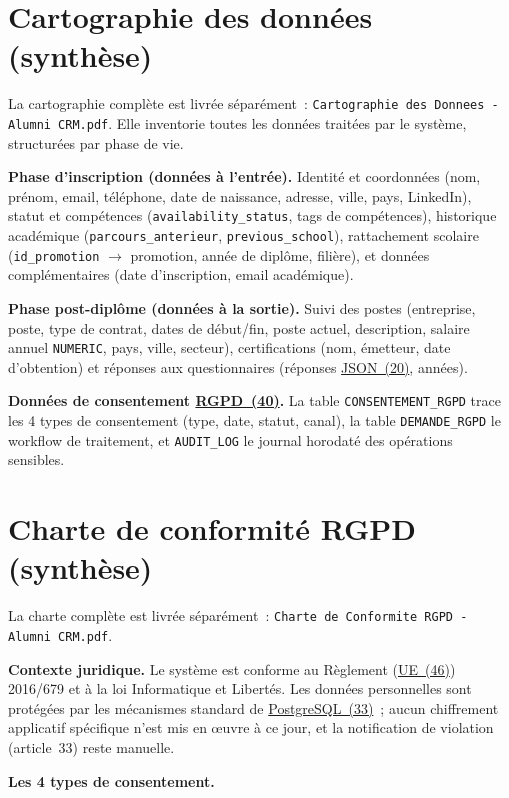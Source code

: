 \documentclass[12pt,a4paper]{report}
\begin{document}
\chapter{Cartographie des données (synthèse)}

\label{app:cartographie}
La cartographie complète est livrée séparément~: \texttt{Cartographie des Donnees - Alumni CRM.pdf}. Elle inventorie toutes les données traitées par le système, structurées par phase de vie.

\textbf{Phase d'inscription (données à l'entrée).} Identité et coordonnées (nom, prénom, email, téléphone, date de naissance, adresse, ville, pays, LinkedIn), statut et compétences (\texttt{availability\_status}, tags de compétences), historique académique (\texttt{parcours\_anterieur}, \texttt{previous\_school}), rattachement scolaire (\texttt{id\_promotion} $\rightarrow$ promotion, année de diplôme, filière), et données complémentaires (date d'inscription, email académique).

\textbf{Phase post-diplôme (données à la sortie).} Suivi des postes (entreprise, poste, type de contrat, dates de début/fin, poste actuel, description, salaire annuel \texttt{NUMERIC}, pays, ville, secteur), certifications (nom, émetteur, date d'obtention) et réponses aux questionnaires (réponses \hyperlink{abbr-JSON}{JSON~(20)}, années).

\textbf{Données de consentement \hyperlink{abbr-RGPD}{RGPD~(40)}.} La table \texttt{CONSENTEMENT\_RGPD} trace les 4 types de consentement (type, date, statut, canal), la table \texttt{DEMANDE\_RGPD} le workflow de traitement, et \texttt{AUDIT\_LOG} le journal horodaté des opérations sensibles.

\chapter{Charte de conformité RGPD (synthèse)}

\label{app:rgpd}
La charte complète est livrée séparément~: \texttt{Charte de Conformite RGPD - Alumni CRM.pdf}.

\textbf{Contexte juridique.} Le système est conforme au Règlement (\hyperlink{abbr-UE}{UE~(46)}) 2016/679 et à la loi Informatique et Libertés. Les données personnelles sont protégées par les mécanismes standard de \hyperlink{abbr-PostgreSQL}{PostgreSQL~(33)}~; aucun chiffrement applicatif spécifique n'est mis en œuvre à ce jour, et la notification de violation (article~33) reste manuelle.

\textbf{Les 4 types de consentement.}
\end{document}
